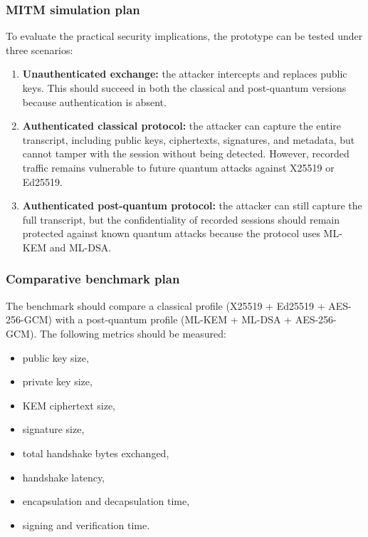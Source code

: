 \documentclass{article}
\begin{document}
      \subsubsection{MITM simulation plan}
      To evaluate the practical security implications, the prototype can be
      tested under three scenarios:
      \begin{enumerate}
            \item \textbf{Unauthenticated exchange:} the attacker intercepts and
                  replaces public keys. This should succeed in both the classical
                  and post-quantum versions because authentication is absent.
            \item \textbf{Authenticated classical protocol:} the attacker can
                  capture the entire transcript, including public keys,
                  ciphertexts, signatures, and metadata, but cannot tamper with
                  the session without being detected. However, recorded traffic
                  remains vulnerable to future quantum attacks against X25519 or
                  Ed25519.
            \item \textbf{Authenticated post-quantum protocol:} the attacker can
                  still capture the full transcript, but the confidentiality of
                  recorded sessions should remain protected against known quantum
                  attacks because the protocol uses ML-KEM and ML-DSA.
      \end{enumerate}

      \subsubsection{Comparative benchmark plan}
      The benchmark should compare a classical profile
      (X25519 + Ed25519 + AES-256-GCM) with a post-quantum profile
      (ML-KEM + ML-DSA + AES-256-GCM). The following metrics should be measured:
      \begin{itemize}
            \item public key size,
            \item private key size,
            \item KEM ciphertext size,
            \item signature size,
            \item total handshake bytes exchanged,
            \item handshake latency,
            \item encapsulation and decapsulation time,
            \item signing and verification time.
      \end{itemize}
\end{document}
